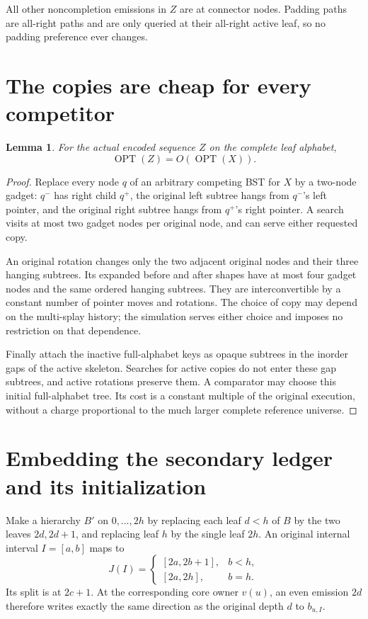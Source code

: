 \documentclass[11pt]{article}
\newtheorem{lemma}[theorem]{Lemma}
\newcommand{\OPT}{\operatorname{OPT}}
\begin{document}
All other noncompletion emissions in $Z$ are at connector nodes.
Padding paths are all-right paths and are only queried at their
all-right active leaf, so no padding preference ever changes.

\section{The copies are cheap for every competitor}

\begin{lemma}\label{lem:competitor}
For the actual encoded sequence $Z$ on the complete leaf alphabet,
\[
 \OPT(Z)=O(\OPT(X)).
\]
\end{lemma}
\begin{proof}
Replace every node $q$ of an arbitrary competing BST for $X$ by a
two-node gadget: $q^-$ has right child $q^+$, the original left subtree
hangs from $q^-$'s left pointer, and the original right subtree hangs
from $q^+$'s right pointer. A search visits at most two gadget nodes per
original node, and can serve either requested copy.

An original rotation changes only the two adjacent original nodes and
their three hanging subtrees. Its expanded before and after shapes have
at most four gadget nodes and the same ordered hanging subtrees. They
are interconvertible by a constant number of pointer moves and rotations.
The choice of copy may depend on the multi-splay history; the simulation
serves either choice and imposes no restriction on that dependence.

Finally attach the inactive full-alphabet keys as opaque subtrees in
the inorder gaps of the active skeleton. Searches for active copies do
not enter these gap subtrees, and active rotations preserve them. A
comparator may choose this initial full-alphabet tree. Its cost is a
constant multiple of the original execution, without a charge
proportional to the much larger complete reference universe.
\end{proof}

\section{Embedding the secondary ledger and its initialization}

Make a hierarchy $B'$ on $0,\ldots,2h$ by replacing each leaf $d<h$
of $B$ by the two leaves $2d,2d+1$, and replacing leaf $h$ by the
single leaf $2h$. An original internal interval $I=[a,b]$ maps to
\[
 J(I)=
 \begin{cases}
 [2a,2b+1],&b<h,\\
 [2a,2h],&b=h.
 \end{cases}
\]
Its split is at $2c+1$. At the corresponding core owner $v(u)$,
an even emission $2d$ therefore writes exactly the same direction as
the original depth $d$ to $b_{u,I}$.
\end{document}

